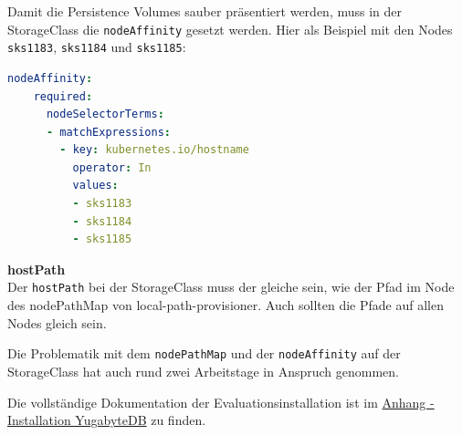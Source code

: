 \begin{flushleft}
    Damit die Persistence Volumes sauber präsentiert werden, muss in der StorageClass die \texttt{nodeAffinity} gesetzt werden.
    Hier als Beispiel mit den Nodes \texttt{sks1183}, \texttt{sks1184} und \texttt{sks1185}:
\lstset{style=gra_codestyle}
\begin{lstlisting}[language=yaml, caption=yugabyteDB - StorageClass nodeAffinity,captionpos=b,label={lst:yugabytedb-storageclass_example},breaklines=true]
  nodeAffinity:
    required:
      nodeSelectorTerms:
      - matchExpressions:
        - key: kubernetes.io/hostname
          operator: In
          values:
          - sks1183
          - sks1184
          - sks1185
\end{lstlisting}
    \begin{warning}
        \textbf{hostPath}\\
        Der \texttt{hostPath} bei der StorageClass muss der gleiche sein, wie der Pfad im Node des nodePathMap von \gls{local-path-provisioner}.
        Auch sollten die Pfade auf allen Nodes gleich sein.
    \end{warning}
\end{flushleft}
\begin{flushleft}
    Die Problematik mit dem \texttt{nodePathMap} und der \texttt{nodeAffinity} auf der StorageClass hat auch rund zwei Arbeitstage in Anspruch genommen.
\end{flushleft}
\begin{flushleft}
    Die vollständige Dokumentation der Evaluationsinstallation ist im \hyperref[subsec:evaluation_installation_yugabytedb]{Anhang - Installation YugabyteDB} zu finden.
\end{flushleft}